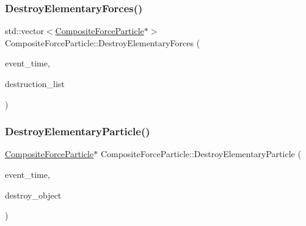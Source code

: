 \mbox{\label{class_composite_force_particle_af07d8607737f7881aac6314313d800e3}} 
\subsubsection{\texorpdfstring{Destroy\+Elementary\+Forces()}{DestroyElementaryForces()}}
{\footnotesize\ttfamily std\+::vector$<$\mbox{\hyperlink{class_composite_force_particle}{Composite\+Force\+Particle}}$\ast$$>$ Composite\+Force\+Particle\+::\+Destroy\+Elementary\+Forces (\begin{DoxyParamCaption}\item[{std\+::chrono\+::time\+\_\+point$<$ \mbox{\hyperlink{universe_8h_a0ef8d951d1ca5ab3cfaf7ab4c7a6fd80}{Clock}} $>$}]{event\+\_\+time,  }\item[{std\+::vector$<$ \mbox{\hyperlink{class_composite_force_particle}{Composite\+Force\+Particle}} $\ast$$>$}]{destruction\+\_\+list }\end{DoxyParamCaption})}

\mbox{\label{class_composite_force_particle_ac176d2e41d75e308d4b510f3338d8b9e}} 
\subsubsection{\texorpdfstring{Destroy\+Elementary\+Particle()}{DestroyElementaryParticle()}}
{\footnotesize\ttfamily \mbox{\hyperlink{class_composite_force_particle}{Composite\+Force\+Particle}}$\ast$ Composite\+Force\+Particle\+::\+Destroy\+Elementary\+Particle (\begin{DoxyParamCaption}\item[{std\+::chrono\+::time\+\_\+point$<$ \mbox{\hyperlink{universe_8h_a0ef8d951d1ca5ab3cfaf7ab4c7a6fd80}{Clock}} $>$}]{event\+\_\+time,  }\item[{\mbox{\hyperlink{class_composite_force_particle}{Composite\+Force\+Particle}} $\ast$}]{destroy\+\_\+object }\end{DoxyParamCaption})}

